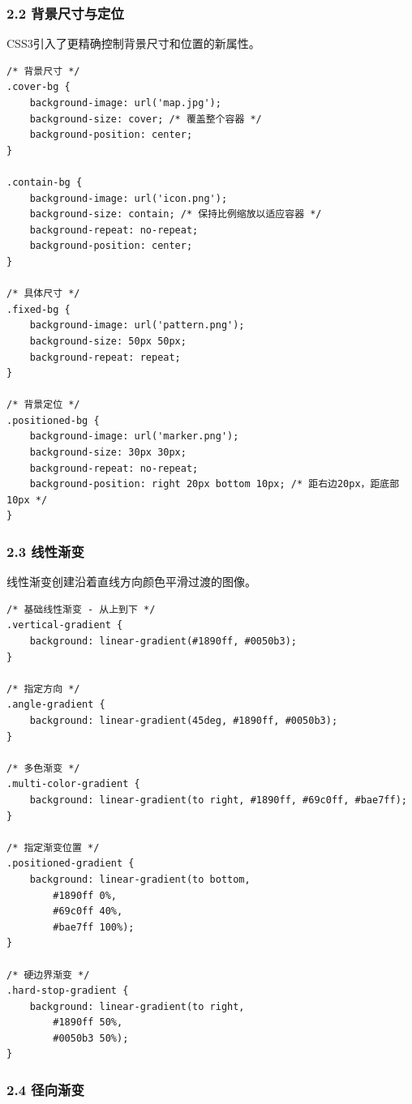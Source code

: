 \subsubsection{2.2
背景尺寸与定位}\label{ux80ccux666fux5c3aux5bf8ux4e0eux5b9aux4f4d}

CSS3引入了更精确控制背景尺寸和位置的新属性。

\begin{lstlisting}
/* 背景尺寸 */
.cover-bg {
    background-image: url('map.jpg');
    background-size: cover; /* 覆盖整个容器 */
    background-position: center;
}

.contain-bg {
    background-image: url('icon.png');
    background-size: contain; /* 保持比例缩放以适应容器 */
    background-repeat: no-repeat;
    background-position: center;
}

/* 具体尺寸 */
.fixed-bg {
    background-image: url('pattern.png');
    background-size: 50px 50px;
    background-repeat: repeat;
}

/* 背景定位 */
.positioned-bg {
    background-image: url('marker.png');
    background-size: 30px 30px;
    background-repeat: no-repeat;
    background-position: right 20px bottom 10px; /* 距右边20px，距底部10px */
}
\end{lstlisting}

\subsubsection{2.3 线性渐变}\label{ux7ebfux6027ux6e10ux53d8}

线性渐变创建沿着直线方向颜色平滑过渡的图像。

\begin{lstlisting}
/* 基础线性渐变 - 从上到下 */
.vertical-gradient {
    background: linear-gradient(#1890ff, #0050b3);
}

/* 指定方向 */
.angle-gradient {
    background: linear-gradient(45deg, #1890ff, #0050b3);
}

/* 多色渐变 */
.multi-color-gradient {
    background: linear-gradient(to right, #1890ff, #69c0ff, #bae7ff);
}

/* 指定渐变位置 */
.positioned-gradient {
    background: linear-gradient(to bottom, 
        #1890ff 0%, 
        #69c0ff 40%, 
        #bae7ff 100%);
}

/* 硬边界渐变 */
.hard-stop-gradient {
    background: linear-gradient(to right,
        #1890ff 50%,
        #0050b3 50%);
}
\end{lstlisting}

\subsubsection{2.4 径向渐变}\label{ux5f84ux5411ux6e10ux53d8}

